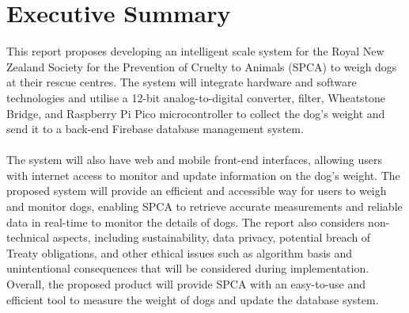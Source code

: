 
\chapter{Executive Summary}

This report proposes developing an intelligent scale system for the Royal New Zealand Society for the Prevention of Cruelty to Animals (SPCA) to weigh dogs at their rescue centres. The system will integrate hardware and software technologies and utilise a 12-bit analog-to-digital converter, filter, Wheatstone Bridge, and Raspberry Pi Pico microcontroller to collect the dog's weight and send it to a back-end Firebase database management system. \\
\\
The system will also have web and mobile front-end interfaces, allowing users with internet access to monitor and update information on the dog's weight. The proposed system will provide an efficient and accessible way for users to weigh and monitor dogs, enabling SPCA to retrieve accurate measurements and reliable data in real-time to monitor the details of dogs. The report also considers non-technical aspects, including sustainability, data privacy, potential breach of Treaty obligations, and other ethical issues such as algorithm basis and unintentional consequences that will be considered during implementation. Overall, the proposed product will provide SPCA with an easy-to-use and efficient tool to measure the weight of dogs and update the database system.